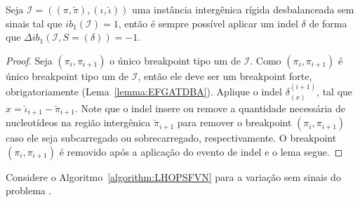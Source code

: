 \begin{lemma}\label{lemma:QNHGBLYF}
Seja $\mathcal{I}=((\pi,\breve\pi),(\iota,\breve\iota))$ uma instância intergênica rígida desbalanceada sem sinais tal que $ib_1(\mathcal{I}) = 1$, então é sempre possível aplicar um indel $\delta$ de forma que $\Delta ib_1(\mathcal{I}, S=(\delta)) = -1$.
\end{lemma}
\begin{proof}
Seja $(\pi_i,\pi_{i+1})$ o único breakpoint tipo um de $\mathcal{I}$. Como $(\pi_i,\pi_{i+1})$ é único breakpoint tipo um de $\mathcal{I}$, então ele deve ser um breakpoint forte, obrigatoriamente (Lema~\ref{lemma:EFGATDBA}). Aplique o indel $\delta_{(x)}^{(i+1)}$, tal que $x = \breve\iota_{i+1} - \breve\pi_{i+1}$. Note que o indel insere ou remove a quantidade necessária de nucleotídeos na região intergênica $\breve\pi_{i+1}$ para remover o breakpoint $(\pi_i,\pi_{i+1})$ caso ele seja subcarregado ou sobrecarregado, respectivamente. O breakpoint $(\pi_i,\pi_{i+1})$ é removido após a aplicação do evento de indel e o lema segue.
\end{proof}

Considere o Algoritmo~\ref{algorithm:LHOPSFVN} para a variação sem sinais do problema \SbIRI{}.



